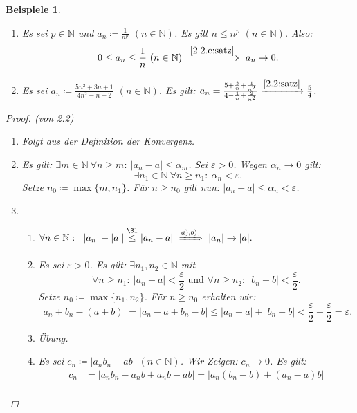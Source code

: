 \documentclass[12pt]{extreport} %
\newcommand{\N}{\mathbb{N}}
\theoremstyle{named}
\theoremstyle{itshape}
\theoremstyle{normal}
\newtheorem*{beispiele}{Beispiele}
\begin{document}
\begin{beispiele} \
	\begin{enumerate}
		\item Es sei $p \in \N$ und $a_{n} \coloneqq \frac{1}{n^{p}}$ $(n \in \N)$. Es gilt $n \leq n^{p}$ $(n \in \N)$. Also: 
			$$ 0 \leq a_{n} \leq \frac{1}{n} ~ (n \in \N) ~  \xRightarrow[]{\ref{2.2.e:satz}}   ~ a_{n} \rightarrow 0. $$
		\item Es sei $a_{n} \coloneqq \frac{5n^{2} + 3n + 1}{4n^{2} - n + 2}$ $(n \in \N)$. Es gilt: 
		      $a_n = \frac{5 + \frac{3}{n} + \frac{1}{n^{2}}}{4 - \frac{1}{n} + \frac{2}{n^{2}}} \xrightarrow[]{\ref{2.2:satz}} \frac{5}{4}$.
	\end{enumerate}
	
	\begin{proof}(von 2.2) ~\
		\begin{enumerate}
			\item Folgt aus der Definition der Konvergenz.
			\item   Es gilt: $\exists m \in \N ~ \forall n \geq m: ~ |a_{n} - a | \leq \alpha_{m}$. Sei $\varepsilon > 0$. Wegen $\alpha_n \to 0$ gilt:
				$$
		 		\exists n_{1} \in \N ~ \forall n \geq n_{1}:  ~ \alpha_{n} < \varepsilon.
		 		$$
		 		Setze $n_{0} \coloneqq \max \{ m , n_{1} \}$. Für $n \geq n_{0}$ gilt nun: $|a_{n} - a| \leq \alpha_{n} < \varepsilon$.
			\item \begin{enumerate}
				\item $\forall n \in \N: ~ | |a_{n}| - |a|| \overset{\S 1}{\leq} |a_{n} - a| ~ \xRightarrow[]{a), b)} ~ |a_{n}| \rightarrow |a|.$
				\item Es sei $\varepsilon > 0$. Es gilt: $\exists n_{1}, n_{2} \in \N$ mit 
				        $$
				        \forall n \geq n_{1}: ~ |a_{n} - a| < \frac{\varepsilon}{2}  \text{ und }  \forall n \geq n_{2}: ~ |b_{n} - b| < \frac{\varepsilon}{2}.
				        $$
					Setze $n_{0} \coloneqq \max \{ n_{1}, n_{2} \}$. Für $n \geq n_{0}$ erhalten wir:
					$$
						|a_{n} + b_{n} - (a + b)| = |a_{n} - a + b_{n} - b| \leq |a_{n} - a| + |b_{n} - b| 
						< \frac{\varepsilon}{2} + \frac{\varepsilon}{2} = \varepsilon.
					$$
				\item Übung.
				\item Es sei $c_{n} \coloneqq |a_{n} b_{n} - ab|$ $(n \in \N)$. Wir Zeigen: $c_{n} \rightarrow 0$. Es gilt:
					\begin{align*}
						c_{n} & = |a_{n}b_{n} - a_{n}b + a_{n}b - ab| = |a_{n}(b_{n} - b)+ (a_{n} - a)b| \\

\end{align*}
\end{enumerate}
\end{enumerate}
\end{proof}
\end{beispiele}
\end{document}
